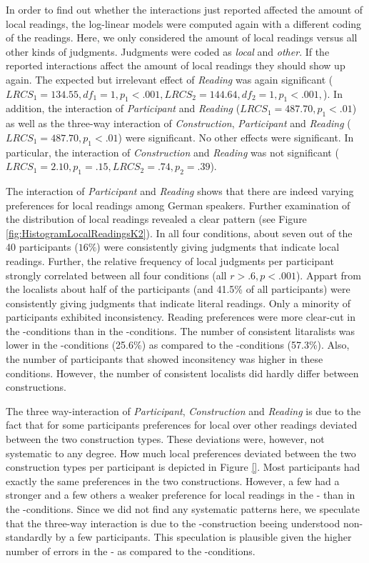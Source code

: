\documentclass[fleqn,reqno,10pt,draft]{article}
\newcommand{\as}{\acro{as}}
\renewcommand{\es}{\acro{es}}
\begin{document}
In order to find out whether the interactions just reported affected
the amount of local readings, the log-linear models were computed
again with a different coding of the readings. Here, we only
considered the amount of local readings versus all other kinds of
judgments. Judgments were coded as {\it local} and {\it other}. If the
reported interactions affect the amount of local readings they should
show up again. The expected but irrelevant effect of {\it Reading} was
again significant ($LRCS_1=134.55, df_1 = 1, p_1<.001, LRCS_2=144.64,
df_2 = 1, p_1<.001,$). In addition, the interaction of {\it
  Participant} and {\it Reading} ($LRCS_1=487.70, p_1<.01$) as well as
the three-way interaction of {\it Construction}, {\it Participant} and
{\it Reading} ($LRCS_1=487.70, p_1<.01$) were significant. No other
effects were significant. In particular, the interaction of {\it
  Construction} and {\it Reading} was not significant ($LRCS_1=2.10,
p_1=.15,LRCS_2=.74, p_2=.39$).

The interaction of {\it Participant} and {\it Reading} shows that
there are indeed varying preferences for local readings among German
speakers. Further examination of the distribution of local readings
revealed a clear pattern (see Figure
\ref{fig:HistogramLocalReadingsK2}). In all four conditions, about
seven out of the 40 participants ($16\%$) were consistently giving
judgments that indicate local readings. Further, the relative
frequency of local judgments per participant strongly correlated
between all four conditions (all $r>.6, p<.001$). Appart from the
localists about half of the participants (and 41.5\% of all
participants) were consistently giving judgments that indicate literal
readings. Only a minority of participants exhibited
inconsistency. Reading preferences were more clear-cut in the
\as-conditions than in the \es-conditions. The number of consistent
litaralists was lower in the \es-conditions (25.6\%) as compared to
the \as-conditions (57.3\%). Also, the number of participants that
showed inconsitency was higher in these conditions. However, the
number of consistent localists did hardly differ between
constructions.

The three way-interaction of {\it Participant}, {\it Construction} and
{\it Reading} is due to the fact that for some participants
preferences for local over other readings deviated between the two
construction types. These deviations were, however, not systematic to
any degree. How much local preferences deviated between the two
construction types per participant is depicted in Figure \ref{}. Most
participants had exactly the same preferences in the two
constructions. However, a few had a stronger and a few others a weaker
preference for local readings in the \es- than in the
\as-conditions. Since we did not find any systematic patterns
here, we speculate that the three-way interaction is due to the
\es-construction beeing understood non-standardly by a
few participants. This speculation is plausible given the higher
number of errors in the \es- as compared to the \as-conditions.
\end{document}

